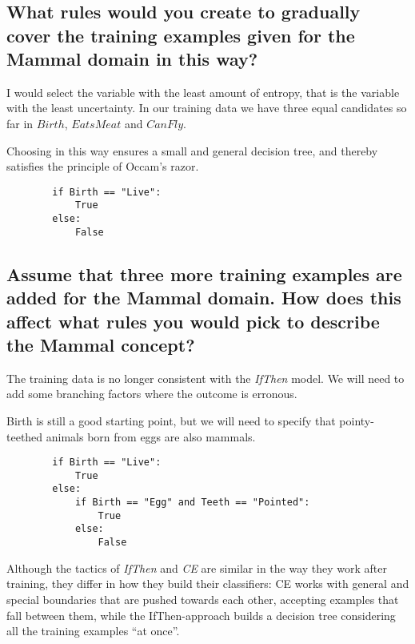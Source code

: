 \documentclass[11pt,a4paper]{article}
\begin{document}
  
  \section{} %
  \label{sec4}
  
    \subsection{What rules would you create to gradually cover the training examples given for the Mammal domain in this way?} %
    \label{sub:what_rules_would_you_create_to_gradually_cover_the_training_examples_given_for_the_mammal_domain_in_this_way}
      
      I would select the variable with the least amount of entropy, that is the variable with the least uncertainty.
      In our training data we have three equal candidates so far in $Birth$, $EatsMeat$ and $CanFly$.
      
      Choosing in this way ensures a small and general decision tree, and thereby satisfies the principle of Occam's razor.
      
      \begin{verbatim}
        if Birth == "Live":
            True
        else:
            False
      \end{verbatim}
      
    
    \subsection{Assume that three more training examples are added for the Mammal domain. How does this affect what rules you would pick to describe the Mammal concept?} %
      
      The training data is no longer consistent with the \emph{IfThen} model.
      We will need to add some branching factors where the outcome is erronous.
      
      Birth is still a good starting point, but we will need to specify that pointy-teethed animals born from eggs are also mammals.
      
      \begin{verbatim}
        if Birth == "Live":
            True
        else:
            if Birth == "Egg" and Teeth == "Pointed":
                True
            else:
                False
      \end{verbatim}
      
      Although the tactics of \emph{IfThen} and \emph{CE} are similar in the way they work after training, they differ in how they build their classifiers:
      CE works with general and special boundaries that are pushed towards each other, accepting examples that fall between them, while the IfThen-approach builds a decision tree considering all the training examples ``at once''.
      
  
\end{document}
